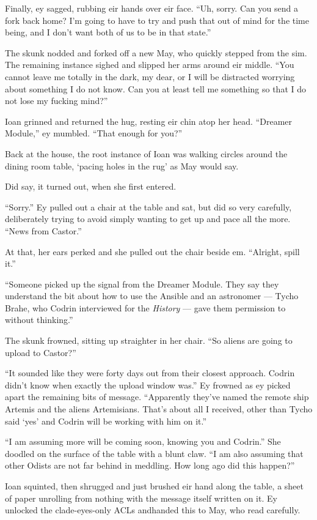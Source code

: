 Finally, ey sagged, rubbing eir hands over eir face. ``Uh, sorry. Can you send a fork back home? I'm going to have to try and push that out of mind for the time being, and I don't want both of us to be in that state.''

The skunk nodded and forked off a new May, who quickly stepped from the sim. The remaining instance sighed and slipped her arms around eir middle. ``You cannot leave me totally in the dark, my dear, or I will be distracted worrying about something I do not know. Can you at least tell me something so that I do not lose my fucking mind?''

Ioan grinned and returned the hug, resting eir chin atop her head. ``Dreamer Module,'' ey mumbled. ``That enough for you?''

Back at the house, the root instance of Ioan was walking circles around the dining room table, `pacing holes in the rug' as May would say.

Did say, it turned out, when she first entered.

``Sorry.'' Ey pulled out a chair at the table and sat, but did so very carefully, deliberately trying to avoid simply wanting to get up and pace all the more. ``News from Castor.''

At that, her ears perked and she pulled out the chair beside em. ``Alright, spill it.''

``Someone picked up the signal from the Dreamer Module. They say they understand the bit about how to use the Ansible and an astronomer — Tycho Brahe, who Codrin interviewed for the \emph{History} — gave them permission to without thinking.''

The skunk frowned, sitting up straighter in her chair. ``So aliens are going to upload to Castor?''

``It sounded like they were forty days out from their closest approach. Codrin didn't know when exactly the upload window was.'' Ey frowned as ey picked apart the remaining bits of message. ``Apparently they've named the remote ship Artemis and the aliens Artemisians. That's about all I received, other than Tycho said `yes' and Codrin will be working with him on it.''

``I am assuming more will be coming soon, knowing you and Codrin.'' She doodled on the surface of the table with a blunt claw. ``I am also assuming that other Odists are not far behind in meddling. How long ago did this happen?''

Ioan squinted, then shrugged and just brushed eir hand along the table, a sheet of paper unrolling from nothing with the message itself written on it. Ey unlocked the clade-eyes-only ACLs andhanded this to May, who read carefully.

